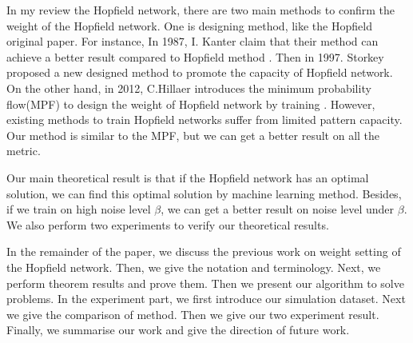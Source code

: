In my review the Hopfield network, there are two main methods to confirm the weight of the Hopfield network. 
One is designing method, like the Hopfield original paper. 
For instance, In 1987, I. Kanter claim that their method can achieve a better result compared to Hopfield method \cite{kanter1987associative}. 
Then in 1997. Storkey proposed a new designed method to promote the capacity of Hopfield network\cite{storkey1999basins}.  
On the other hand, in 2012, C.Hillaer introduces the minimum probability flow(MPF) to design the weight of Hopfield network by training \cite{hillar2012efficient}. 
However, existing methods to train Hopfield networks  suffer from limited pattern capacity. 
Our method is similar to the MPF, but we can get a better result on all the metric.

Our main theoretical result is that if the Hopfield network has an optimal solution, we can find this optimal solution by machine learning method. 
Besides, if we train on high noise level $\beta$, we can get a better result on noise level under $\beta$. 
We also perform two experiments to verify our theoretical results.


In the remainder of the paper, we discuss the previous work on weight setting of the Hopfield network. 
Then, we give the notation and terminology. 
Next, we perform theorem results and prove them. Then we present our algorithm to solve problems. 
In the experiment part, we first introduce our simulation dataset. 
Next we give the comparison of method. Then we give our two experiment result. 
Finally, we summarise our work and give the direction of future work. 